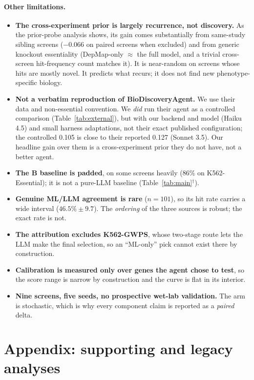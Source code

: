 \documentclass[11pt]{article}
\begin{document}
\paragraph{Other limitations.}
\begin{itemize}\itemsep2pt
  \item \textbf{The cross-experiment prior is largely recurrence, not discovery.} As the prior-probe
  analysis shows, its gain comes substantially from same-study sibling screens ($-0.066$ on paired
  screens when excluded) and from generic knockout essentiality (DepMap-only $\approx$ the full model,
  and a trivial cross-screen hit-frequency count matches it). It is near-random on screens whose hits
  are mostly novel. It predicts what recurs; it does not find new phenotype-specific biology.
  \item \textbf{Not a verbatim reproduction of BioDiscoveryAgent.} We use their data and non-essential
  convention. We \emph{did} run their agent as a controlled comparison (Table~\ref{tab:external}), but
  with our backend and model (Haiku 4.5) and small harness adaptations, not their exact published
  configuration; the controlled 0.105 is close to their reported 0.127 (Sonnet 3.5). Our headline gain
  over them is a cross-experiment prior they do not have, not a better agent.
  \item \textbf{The B baseline is padded}, on some screens heavily
  (86\% on K562-Essential); it is not a pure-LLM baseline (Table~\ref{tab:main}$^\dagger$).
  \item \textbf{Genuine ML/LLM agreement is rare} ($n=101$), so its hit rate carries a wide interval
  ($46.5\% \pm 9.7$). The \emph{ordering} of the three sources is robust; the exact rate is not.
  \item \textbf{The attribution excludes K562-GWPS}, whose two-stage route lets the LLM make the final
  selection, so an ``ML-only'' pick cannot exist there by construction.
  \item \textbf{Calibration is measured only over genes the agent chose to test}, so the score range is
  narrow by construction and the curve is flat in its interior.
  \item \textbf{Nine screens, five seeds, no prospective wet-lab validation.} The arm is stochastic,
  which is why every component claim is reported as a \emph{paired} delta.
\end{itemize}


\section*{Appendix: supporting and legacy analyses}
\end{document}
